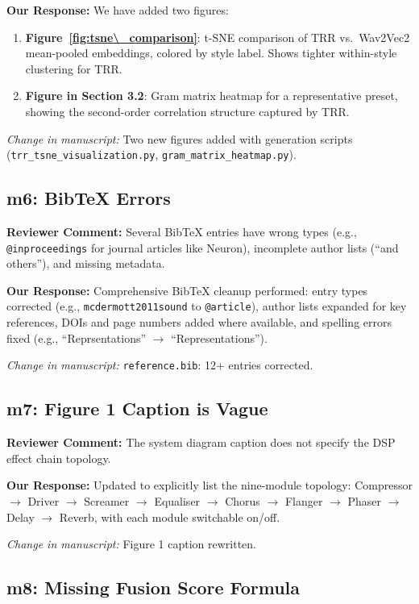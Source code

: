\documentclass[11pt]{article}
\newcommand{\reviewer}[1]{\textcolor{reviewercolor}{\textbf{Reviewer Comment:} #1}}
\newcommand{\response}[1]{\textcolor{responsecolor}{\textbf{Our Response:} #1}}
\newcommand{\change}[1]{\textit{Change in manuscript:} #1}
\begin{document}
\response{We have added two figures:}
\begin{enumerate}[leftmargin=*]
\item \textbf{Figure~\ref{fig:tsne\_comparison}}: t-SNE comparison of TRR vs.\ Wav2Vec2 mean-pooled embeddings, colored by style label. Shows tighter within-style clustering for TRR.
\item \textbf{Figure in Section 3.2}: Gram matrix heatmap for a representative preset, showing the second-order correlation structure captured by TRR.
\end{enumerate}

\change{Two new figures added with generation scripts (\texttt{trr\_tsne\_visualization.py}, \texttt{gram\_matrix\_heatmap.py}).}

\subsection*{m6: BibTeX Errors}

\reviewer{Several BibTeX entries have wrong types (e.g., \texttt{@inproceedings} for journal articles like Neuron), incomplete author lists (``and others''), and missing metadata.}

\response{Comprehensive BibTeX cleanup performed: entry types corrected (e.g., \texttt{mcdermott2011sound} to \texttt{@article}), author lists expanded for key references, DOIs and page numbers added where available, and spelling errors fixed (e.g., ``Reprsentations'' $\to$ ``Representations'').}

\change{\texttt{reference.bib}: 12+ entries corrected.}

\subsection*{m7: Figure 1 Caption is Vague}

\reviewer{The system diagram caption does not specify the DSP effect chain topology.}

\response{Updated to explicitly list the nine-module topology: Compressor $\to$ Driver $\to$ Screamer $\to$ Equaliser $\to$ Chorus $\to$ Flanger $\to$ Phaser $\to$ Delay $\to$ Reverb, with each module switchable on/off.}

\change{Figure 1 caption rewritten.}

\subsection*{m8: Missing Fusion Score Formula}
\end{document}
